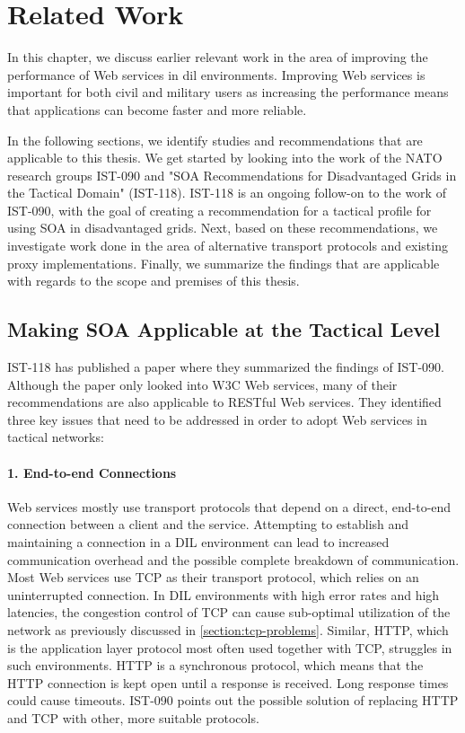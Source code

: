 \chapter{Related Work}
\label{chapter:related-work}


In this chapter, we discuss earlier relevant work in the area of improving the
performance of Web services in \gls{dil} environments. Improving Web services is
important for both civil and military users as increasing the performance means
that applications can become faster and more reliable.

In the following sections, we identify studies and recommendations that are
applicable to this thesis. We get started by looking into the work of the NATO
research groups IST-090 and "SOA Recommendations for Disadvantaged Grids in the
Tactical Domain" (IST-118). IST-118 is an ongoing follow-on to the work of
IST-090, with the goal of creating a recommendation for a tactical profile for
using SOA in disadvantaged grids. Next, based on these recommendations, we
investigate work done in the area of alternative transport protocols and
existing proxy implementations.  Finally, we summarize the findings that are
applicable with regards to the scope and premises of this thesis.

\section{Making SOA Applicable at the Tactical Level}

IST-118 has published a paper\cite{ist-118} where they summarized the findings
of IST-090. Although the paper only looked into W3C Web services, many of their
recommendations are also applicable to RESTful Web services. They identified
three key issues that need to be addressed in order to adopt Web services in
tactical networks:

\label{section:DIL-problems}

\subsubsection{1. End-to-end Connections}

Web services mostly use transport protocols that depend on a direct, end-to-end
connection between a client and the service. Attempting to establish and
maintaining a connection in a DIL environment can lead to increased communication
overhead and the possible complete breakdown of communication. Most Web services use
TCP as their transport protocol, which relies on an uninterrupted connection.
In DIL environments with high error rates and high latencies,
the congestion control of TCP can cause sub-optimal utilization of the network
as previously discussed in \cref{section:tcp-problems}. Similar, HTTP, which is
the application layer protocol most often used together with TCP, struggles in
such environments. HTTP is a synchronous protocol, which means that the HTTP
connection is kept open until a response is received. Long response times could cause
timeouts. IST-090 points out the possible solution of replacing HTTP and TCP with
other, more suitable protocols.

